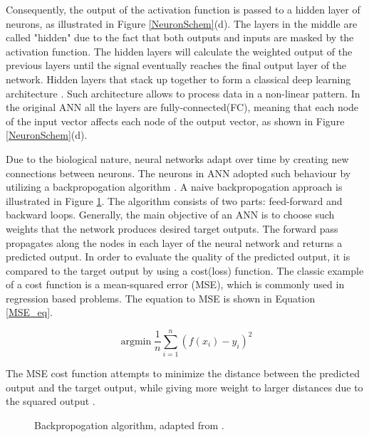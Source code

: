 \documentclass[english, 12pt, a4paper, elec, utf8, a-1b, online]{aaltothesis}
\begin{document}
Consequently, the output of the activation function is passed to a hidden layer of neurons, as illustrated in Figure \ref{NeuronSchem}(d). The layers in the middle are called "hidden" due to the fact that both outputs and inputs are masked by the activation function.  The hidden layers will calculate the weighted output of the previous layers until the signal eventually reaches the final output layer of the network. Hidden layers that stack up together to form a classical deep learning architecture \cite{OShea2015}. Such architecture allows to process data in a non-linear pattern. In the original ANN all the layers are fully-connected(FC), meaning that each node of the input vector affects each node of the output vector, as shown in Figure \ref{NeuronSchem}(d).


Due to the biological nature, neural networks adapt over time by creating new connections between neurons. The neurons in ANN adopted such behaviour by utilizing a backpropogation algorithm \cite{Rumelhart:1986we}. A naive backpropogation approach is illustrated in Figure \ref{fig:backprop}. The algorithm consists of two parts: feed-forward and backward loops. Generally, the main objective of an ANN is to choose such weights that the network produces desired target outputs. The forward pass propagates along the nodes in each layer of the neural network and returns a predicted output. In order to evaluate the quality of the predicted output, it is compared to the target output by using a cost(loss) function. The classic example of a cost function is a mean-squared error (MSE), which is commonly used in regression based problems. The equation to MSE is shown in Equation \ref{MSE_eq}.

\begin{equation}
{\operatorname{argmin}} \frac{1}{n} \sum_{i=1}^{n}\left(f\left(x_{i}\right)-y_{i}\right)^{2}
\end{equation}\label{MSE_eq} 

The MSE cost function attempts to minimize the distance between the predicted output and the target output, while giving more weight to larger distances due to the squared output \cite{Albarghouthi2021}.


\begin{figure}[htb]
    \centering
    \qquad
    \caption{Backpropogation algorithm, adapted from \cite{Alber2018}.}\label{fig:backprop}%
\end{figure}
\FloatBarrier
\end{document}
